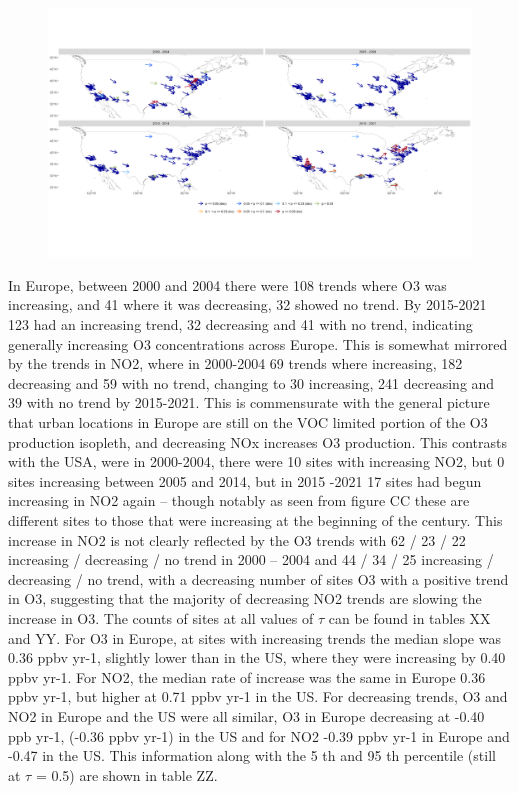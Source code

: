 \documentclass[journal abbreviation, manuscript]{copernicus}
\begin{document}
\begin{figure}[htbp]
\includegraphics[width=12cm]{plots/arrow_maps/no2/11/US_map_spc_no2_tau_0.5_seg_11_14.png}
\caption{}
\label{fig:arrow_us_no2}
\end{figure}

In Europe, between 2000 and 2004 there were 108 trends where O3 was increasing, and 41 where it was decreasing, 32 showed no trend. By 2015-2021 123 had an increasing trend, 32 decreasing and 41 with no trend, indicating generally increasing O3 concentrations across Europe. This is somewhat mirrored by the trends in NO2, where in 2000-2004 69 trends where increasing, 182 decreasing and 59 with no trend, changing to 30 increasing, 241 decreasing and 39 with no trend by 2015-2021. This is commensurate with the general picture that urban locations in Europe are still on the VOC limited portion of the O3 production isopleth, and decreasing NOx increases O3 production. 
This contrasts with the USA, were in 2000-2004, there were 10 sites with increasing NO2, but 0 sites increasing between 2005 and 2014, but in 2015 -2021 17 sites had begun increasing in NO2 again – though notably as seen from figure CC these are different sites to those that were increasing at the beginning of the century. This increase in NO2 is not clearly reflected by the O3 trends with 62 / 23 / 22 increasing / decreasing / no trend in 2000 – 2004 and 44 / 34 / 25 increasing / decreasing / no trend, with a decreasing number of sites O3 with a positive trend in O3, suggesting that the majority of decreasing NO2 trends are slowing the increase in O3. The counts of sites at all values of $\tau$ can be found in tables XX and YY. 
For O3 in Europe, at sites with increasing trends the median slope was 0.36 ppbv yr-1, slightly lower than in the US, where they were increasing by 0.40 ppbv yr-1. For NO2, the median rate of increase was the same in Europe 0.36 ppbv yr-1, but higher at 0.71 ppbv yr-1 in the US. For decreasing trends, O3 and NO2 in Europe and the US were all similar, O3 in Europe decreasing at -0.40 ppb yr-1, (-0.36 ppbv yr-1) in the US and for NO2 -0.39 ppbv yr-1 in Europe and -0.47 in the US. This information along with the 5 th and 95 th percentile (still at $\tau$ = 0.5) are shown in table ZZ. 
\end{document}
